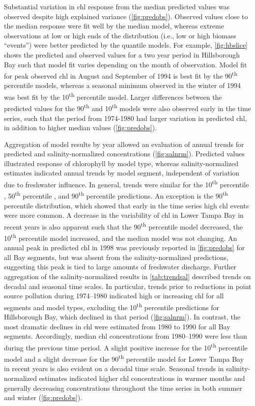 \documentclass{svjour3}\usepackage[]{graphicx}\usepackage[]{color}
\newcommand{\nine}{90\textsuperscript{th} percentile }
\newcommand{\five}{50\textsuperscript{th} percentile }
\newcommand{\ten}{10\textsuperscript{th} percentile }
\begin{document}
Substantial variation in \ac{chl} response from the median predicted values was observed despite high explained variance (\cref{fig:predobs}).  Observed values close to the median response were fit well by the median model, whereas extreme observations at low or high ends of the distribution (i.e., low or high biomass ``events'') were better predicted by the quantile models. For example, \cref{fig:hbslice} shows the predicted and observed values for a two year period in Hillsborough Bay such that model fit varies depending on the month of observation.  Model fit for peak observed \ac{chl} in August and September of 1994 is best fit by the \nine models, whereas a seasonal minimum observed in the winter of 1994 was best fit by the \ten model.  Larger differences between the predicted values for the 90\textsuperscript{th} and 10\textsuperscript{th} models were also observed early in the time series, such that the period from 1974-1980 had larger variation in predicted \ac{chl}, in addition to higher median values (\cref{fig:predobs}).  

Aggregation of model results by year allowed an evaluation of annual trends for predicted and salinity-normalized concentrations (\cref{fig:salnrm}).  Predicted values illustrated response of chlorophyll by model type, whereas salinity-normalized estimates indicated annual trends by model segment, independent of variation due to freshwater influence.  In general, trends were similar for the \ten, \five, and \nine predictions.  An exception is the \nine distribution, which showed that early in the time series high \ac{chl} events were more common.  A decrease in the variability of \ac{chl} in Lower Tampa Bay in recent years is also apparent such that the \nine model decreased, the \ten model increased, and the median model was not changing.  An annual peak in predicted \ac{chl} in 1998 was previously reported in \cref{fig:predobs} for all Bay segments, but was absent from the salinity-normalized predictions, suggesting this peak is tied to large amounts of freshwater discharge. Further aggregation of the salinity-normalized results in \cref{tab:trendsal} described trends on decadal and seasonal time scales.  In particular, trends prior to reductions in point source pollution during 1974--1980 indicated high or increasing \ac{chl} for all segments and model types, excluding the \ten predictions for Hillsborough Bay, which declined in that period (\cref{fig:salnrm}).  In contrast, the most dramatic declines in \ac{chl} were estimated from 1980 to 1990 for all Bay segments.  Accordingly, median \ac{chl} concentrations from 1980--1990 were less than during the previous time period.  A slight positive increase for the \ten model and a slight decrease for the \nine model for Lower Tampa Bay in recent years is also evident on a decadal time scale.  Seasonal trends in salinity-normalized estimates indicated higher \ac{chl} concentrations in warmer months and generally decreasing concentrations throughout the time series in both summer and winter (\cref{fig:predobs}).
\end{document}
